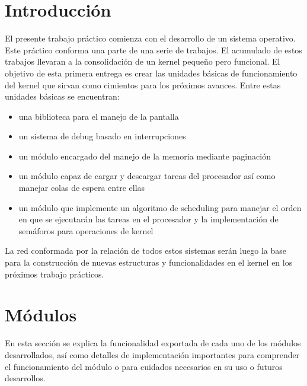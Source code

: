 \documentclass[a4paper]{article}
\begin{document}
\maketitle
\tableofcontents
\newpage

\section{Introducción}
El presente trabajo práctico comienza con el desarrollo de un sistema operativo. Este práctico conforma una parte de una serie de trabajos. El acumulado de estos trabajos llevaran a la consolidación de un kernel pequeño pero funcional. El objetivo de esta primera entrega es crear las unidades básicas de funcionamiento del kernel que sirvan como cimientos para los próximos avances. Entre estas unidades básicas se encuentran: 

\begin{itemize}
  \item una biblioteca para el manejo de la pantalla
  \item un sistema de debug basado en interrupciones
  \item un módulo encargado del manejo de la memoria mediante paginación
  \item un módulo capaz de cargar y descargar tareas del procesador así como manejar colas de espera entre ellas
  \item un módulo que implemente un algoritmo de scheduling para manejar el orden en que se ejecutarán las tareas en el procesador y la implementación de semáforos para operaciones de kernel
\end{itemize}

La red conformada por la relación de todos estos sistemas serán luego la base para la construcción de nuevas estructuras y funcionalidades en el kernel en los próximos trabajo prácticos. 

\newpage

\section{Módulos}

En esta sección se explica la funcionalidad exportada de cada uno de los módulos desarrollados, así como detalles de implementación importantes para comprender el funcionamiento del módulo o para cuidados necesarios en su uso o futuros desarrollos. 

\end{document}
